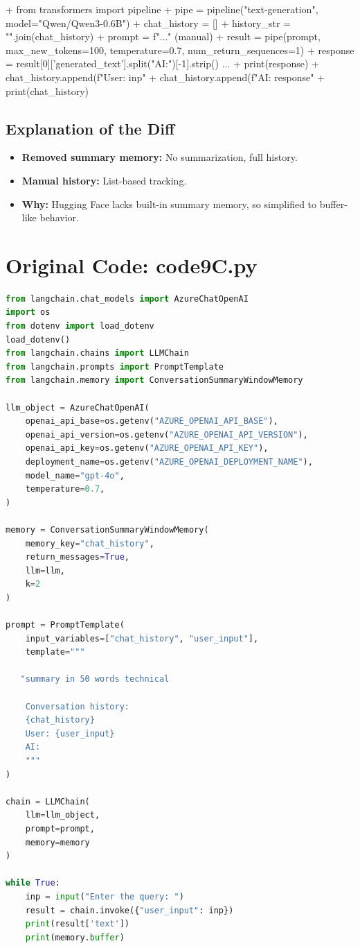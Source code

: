 \documentclass[11pt, a4paper]{article}
\begin{document}
\begin{addedcode}
\begin{diffverb}
+ from transformers import pipeline
+ pipe = pipeline("text-generation", model="Qwen/Qwen3-0.6B")
+ chat_history = []
+ history_str = "\n".join(chat_history)
+ prompt = f"..." (manual)
+ result = pipe(prompt, max_new_tokens=100, temperature=0.7, num_return_sequences=1)
+ response = result[0]['generated_text'].split("AI:")[-1].strip() ...
+ print(response)
+ chat_history.append(f"User: {inp}"
+ chat_history.append(f"AI: {response}"
+ print(chat_history)
\end{diffverb}
\end{addedcode}


\subsection{Explanation of the Diff}
\begin{itemize}
    \item \textbf{Removed summary memory:} No summarization, full history.
    \item \textbf{Manual history:} List-based tracking.
    \item \textbf{Why:} Hugging Face lacks built-in summary memory, so simplified to buffer-like behavior.
\end{itemize}


\newpage
\section{Original Code: code9C.py}
\begin{lstlisting}[language=Python]
from langchain.chat_models import AzureChatOpenAI
import os
from dotenv import load_dotenv
load_dotenv()
from langchain.chains import LLMChain
from langchain.prompts import PromptTemplate
from langchain.memory import ConversationSummaryWindowMemory

llm_object = AzureChatOpenAI(
    openai_api_base=os.getenv("AZURE_OPENAI_API_BASE"),
    openai_api_version=os.getenv("AZURE_OPENAI_API_VERSION"),
    openai_api_key=os.getenv("AZURE_OPENAI_API_KEY"),
    deployment_name=os.getenv("AZURE_OPENAI_DEPLOYMENT_NAME"),
    model_name="gpt-4o",
    temperature=0.7,
)

memory = ConversationSummaryWindowMemory(
    memory_key="chat_history",
    return_messages=True,
    llm=llm,
    k=2
)

prompt = PromptTemplate(
    input_variables=["chat_history", "user_input"],
    template="""

   "summary in 50 words technical

    Conversation history:
    {chat_history}
    User: {user_input}
    AI:
    """
)

chain = LLMChain(
    llm=llm_object,
    prompt=prompt,
    memory=memory
)

while True:
    inp = input("Enter the query: ")
    result = chain.invoke({"user_input": inp})
    print(result['text'])
    print(memory.buffer)
\end{lstlisting}
\end{document}
